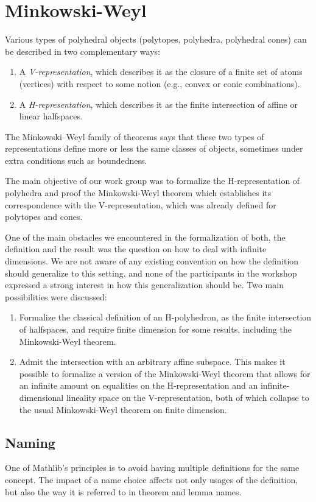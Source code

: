 \section{Minkowski-Weyl}

Various types of polyhedral objects (polytopes, polyhedra, polyhedral cones)
can be described in two complementary ways:
\begin{enumerate}
  \item A \emph{V-representation}, which describes it as the closure of a finite
  set of atoms (vertices) with respect to some notion
  (e.g., convex or conic combinations).
  \item A \emph{H-representation}, which describes it as the finite intersection
  of affine or linear halfspaces.
\end{enumerate}

The Minkowski--Weyl family of theorems says that these two types of
representations define more or less the same classes of objects,
sometimes under extra conditions such as boundedness.

The main objective of our work group was to formalize the H-representation of polyhedra
and proof the Minkowski-Weyl theorem which establishes its correspondence with the
V-representation, which was already defined for polytopes and cones.

One of the main obstacles we encountered in the formalization of both, the definition and
the result was the question on how to deal with infinite dimensions.
We are not aware of any existing convention on how the definition should generalize to this setting,
and none of the participants in the workshop expressed a strong interest in how this generalization
should be.
Two main possibilities were discussed:
\begin{enumerate}
  \item Formalize the classical definition of an H-polyhedron, as the finite intersection of
  halfspaces, and require finite dimension for some results, including the Minkowski-Weyl theorem.
  \item Admit the intersection with an arbitrary affine subspace.
  This makes it possible to formalize a version of the Minkowski-Weyl theorem that allows for
  an infinite amount on equalities on the H-representation and an infinite-dimensional lineality
  space on the V-representation, both of which collapse to the usual Minkowski-Weyl theorem on
  finite dimension.
\end{enumerate}

\subsection{Naming}
\label{subsec:mw:naming}
One of Mathlib's principles is to avoid having multiple definitions for the same concept.
The impact of a name choice affects not only usages of the definition, but also the way it is
referred to in theorem and lemma names.

